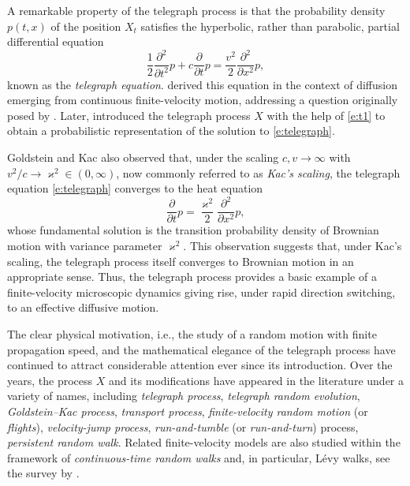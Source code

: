 \documentclass[10pt]{article}
\newcommand{\1}{1\!\!\!\;{\rm I}}
\theoremstyle{plain}
\theoremstyle{definition}
\numberwithin{equation}{section}
\begin{document}
A remarkable property of the telegraph process
is that the probability density $p(t,x)$ of the position $X_t$ satisfies the hyperbolic, rather than parabolic,
partial differential equation
\begin{equation}
\label{e:telegraph}
\frac12\frac{\partial^2}{\partial t^2}p
+c\frac{\partial}{\partial t}p
=\frac{v^2}{2}\frac{\partial^2}{\partial x^2}p,
\end{equation}
known as the \emph{telegraph equation}. \cite{goldstein1951diffusion} derived this equation in the
context of diffusion emerging from continuous finite-velocity motion,
addressing a question originally posed by \cite{taylor1922diffusion}. Later, \cite{kac1956some,kac1974stochastic}
introduced the telegraph process $X$ with the help of \eqref{e:t1} to obtain a probabilistic representation of
the solution to \eqref{e:telegraph}.

Goldstein and Kac also observed that, under the scaling
$c,v\to\infty$ with $v^2/c\to\varkappa^2\in(0,\infty)$,
now commonly referred to as \emph{Kac's scaling}, the telegraph equation \eqref{e:telegraph} converges to the heat equation
\begin{equation}
\frac{\partial}{\partial t}p
=\frac{\varkappa^2}{2}\frac{\partial^2}{\partial x^2}p,
\end{equation}
whose fundamental solution is the transition probability density of Brownian motion with variance parameter $\varkappa^2$.
This observation suggests that, under Kac's scaling, the telegraph process itself converges to Brownian motion in an appropriate sense.
Thus, the telegraph process provides a basic example of a finite-velocity microscopic dynamics giving rise,
under rapid direction switching, to an effective diffusive motion.

The clear physical motivation, i.e., the study of a random motion with finite propagation speed, and the mathematical
elegance of the telegraph process have continued to attract considerable attention ever since its introduction.
Over the years, the process $X$ and its modifications have appeared in the literature under a variety of names,
including \emph{telegraph process}, \emph{telegraph random evolution}, \emph{Goldstein--Kac process},
\emph{transport process}, \emph{finite-velocity random motion} (or \emph{flights}),
\emph{velocity-jump process}, \emph{run-and-tumble} (or \emph{run-and-turn}) process,
\emph{persistent random walk}.
Related finite-velocity models are also studied within the framework of \emph{continuous-time random walks}
and, in particular, L\'evy walks, see the survey by \cite{zaburdaev2015levy}.
\end{document}
